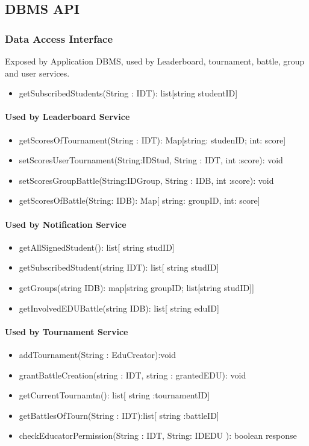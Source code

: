\subsection{DBMS API}
\subsubsection{Data Access Interface}
Exposed by Application DBMS, used by Leaderboard, tournament, battle, group and user services. 
\begin{itemize}
    \item getSubscribedStudents(String : IDT): list[string studentID]
\end{itemize}
\paragraph{Used by Leaderboard Service}
\begin{itemize}
    \item getScoresOfTournament(String : IDT): Map[string: studenID; int: score]
    \item setScoresUserTournament(String:IDStud, String : IDT, int :score): void
    \item setScoresGroupBattle(String:IDGroup, String : IDB, int :score): void
    \item getScoresOfBattle(String: IDB): Map[ string: groupID, int: score]
\end{itemize}
\paragraph{Used by Notification Service}
\begin{itemize}
    \item getAllSignedStudent(): list[ string studID]
    \item getSubscribedStudent(string IDT): list[ string studID]
    \item getGroups(string IDB): map[string groupID; list[string studID]]
    \item getInvolvedEDUBattle(string IDB): list[ string eduID]
\end{itemize}
\paragraph{Used by Tournament Service}
\begin{itemize}
    \item addTournament(String : EduCreator):void
    \item grantBattleCreation(string : IDT, string : grantedEDU): void
    \item getCurrentTournamtn(): list[ string :tournamentID]
    \item getBattlesOfTourn(String : IDT):list[ string :battleID]
    \item checkEducatorPermission(String : IDT, String: IDEDU ): boolean response
\end{itemize}
